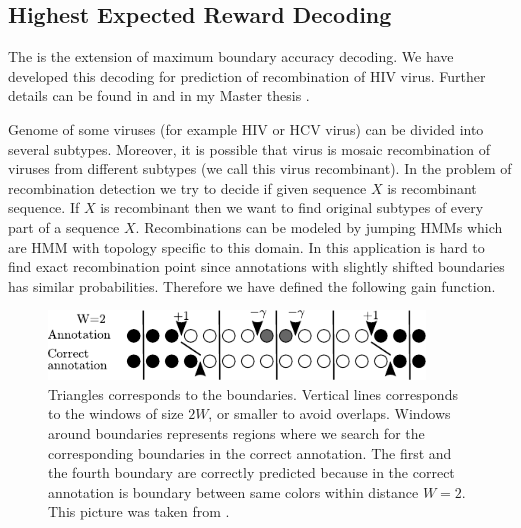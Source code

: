 \subsection{Highest Expected Reward Decoding}\label{SECTION:HERD}

The  is the extension of maximum
boundary accuracy decoding. We have developed this decoding for prediction of
recombination of HIV virus.  Further details can be found in \cite{Nanasi2010}
and in my Master thesis \cite{Nanasi2010mgr}.


Genome of some viruses (for example HIV or HCV virus) can be divided into
several subtypes. Moreover, it is possible that virus is mosaic
recombination of viruses from different subtypes (we call this virus
recombinant). In the problem of recombination detection we try to decide if
given sequence $X$ is recombinant sequence. If $X$ is recombinant then we want to find
original subtypes of every part of a sequence $X$. Recombinations can be modeled
by jumping HMMs \cite{Schultz2006} which are HMM with topology specific to this domain.
In this application is 
hard to find exact recombination point since annotations with slightly shifted
boundaries has similar probabilities. Therefore we have defined the following gain
function.

\begin{figure}
\begin{center}
\includegraphics[width=10cm]{../figures/HERDbuddy.pdf}
\end{center}
\caption[Highest Expected Reward Decoding explanation]{
Triangles corresponds to the boundaries. Vertical lines corresponds to the windows
of size $2W$, or smaller to avoid overlaps. Windows around boundaries
represents regions where we search for the corresponding boundaries in the correct
annotation.
The first and the fourth boundary are correctly predicted because in the correct
annotation is boundary between same colors within distance $W=2$.
This picture was taken from \cite{Nanasi2010mgr}.
}\label{FIGURE:HERDBUDDY}
\end{figure}

